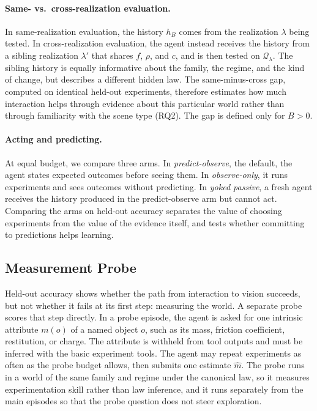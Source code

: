 \paragraph{Same- vs.\ cross-realization evaluation.} In same-realization evaluation, the history $h_B$ comes from the realization $\lambda$ being tested. In cross-realization evaluation, the agent instead receives the history from a sibling realization $\lambda'$ that shares $f$, $\rho$, and $c$, and is then tested on $\mathcal{Q}_\lambda$. The sibling history is equally informative about the family, the regime, and the kind of change, but describes a different hidden law. The same-minus-cross gap, computed on identical held-out experiments, therefore estimates how much interaction helps through evidence about this particular world rather than through familiarity with the scene type (RQ2). The gap is defined only for $B>0$.

\paragraph{Acting and predicting.} At equal budget, we compare three arms. In \emph{predict-observe}, the default, the agent states expected outcomes before seeing them. In \emph{observe-only}, it runs experiments and sees outcomes without predicting. In \emph{yoked passive}, a fresh agent receives the history produced in the predict-observe arm but cannot act. Comparing the arms on held-out accuracy separates the value of choosing experiments from the value of the evidence itself, and tests whether committing to predictions helps learning.

\subsection{Measurement Probe}
\label{sec:protocol:probe}

Held-out accuracy shows whether the path from interaction to vision succeeds, but not whether it fails at its first step: measuring the world. A separate probe scores that step directly. In a probe episode, the agent is asked for one intrinsic attribute $m(o)$ of a named object $o$, such as its mass, friction coefficient, restitution, or charge. The attribute is withheld from tool outputs and must be inferred with the basic experiment tools. The agent may repeat experiments as often as the probe budget allows, then submits one estimate $\hat m$. The probe runs in a world of the same family and regime under the canonical law, so it measures experimentation skill rather than law inference, and it runs separately from the main episodes so that the probe question does not steer exploration.

